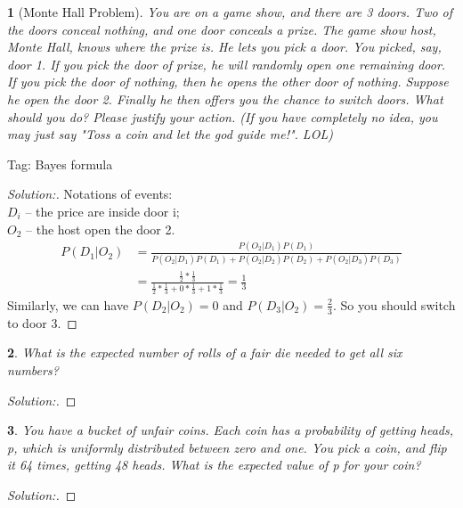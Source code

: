 \documentclass[10pt]{report}
\newtheorem{exe}{}[chapter]
\newenvironment{sol}{\begin{proof}[Solution:]}{\end{proof}}
\begin{document}
\begin{exe}[Monte Hall Problem]
You are on a game show, and there are 3 doors. Two of the doors conceal nothing, and one door conceals a prize. The game show host, Monte Hall, knows where the prize is. He lets you pick a door. You picked, say, door 1. If you pick the door of prize, he will randomly open one remaining door. If you pick the door of nothing, then he opens the other door of nothing. Suppose he open the door 2. Finally he then offers you the chance to switch doors. What should you do? Please justify your action. (If you have completely no idea, you may just say "Toss a coin and let the god guide me!". LOL) 
\end{exe}
\begin{teacher}
Tag: Bayes formula
\begin{sol}
Notations of events:\\
$D_i$ -- the price are inside door i;\\
$O_2$ -- the host open the door 2.
\begin{align*}
    P(D_1|O_2) &= \frac{P(O_2|D_1)P(D_1)}{P(O_2|D_1)P(D_1)+P(O_2|D_2)P(D_2)+P(O_2|D_3)P(D_3)}\\
    &=\frac{\frac{1}{2}*\frac{1}{3}}{\frac{1}{2}*\frac{1}{3}+0*\frac{1}{3}+1*\frac{1}{3}}=\frac{1}{3}
\end{align*}
Similarly, we can have $P(D_2|O_2)=0$ and $P(D_3|O_2) = \frac{2}{3}$. So you should switch to door 3.
\end{sol}
\end{teacher}

\begin{exe}
What is the expected number of rolls of a fair die needed to get all six
numbers?
\end{exe}
\begin{teacher}
\begin{sol}
\end{sol}
\end{teacher}

\begin{exe}
You have a bucket of unfair coins. Each coin has a probability of getting heads, p, which is uniformly distributed between zero and one. You pick a coin, and flip it 64 times, getting 48 heads. What is the expected value of p for your coin?
\end{exe}
\begin{teacher}
\begin{sol}
\end{sol}
\end{teacher}
\end{document}
